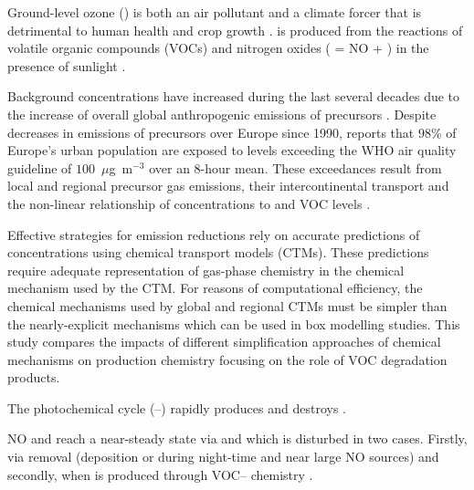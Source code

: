 Ground-level ozone () is both an air pollutant and a climate forcer that is detrimental to human health and crop growth \citep{Stevenson:2013}. 
 is produced from the reactions of volatile organic compounds (VOCs) and nitrogen oxides ( = NO + ) in the presence of sunlight \citep{Atkinson:2000}.

Background  concentrations have increased during the last several decades due to the increase of overall global anthropogenic emissions of  precursors \citep{HTAP:2010}.
Despite decreases in emissions of  precursors over Europe since 1990, \citet{AQEU:2014} reports that $98$\% of Europe's urban population are exposed to levels exceeding the WHO air quality guideline of \mbox{$100$ $\mu$g m$^{-3}$} over an \mbox{$8$-hour} mean.
These exceedances result from local and regional  precursor gas emissions, their intercontinental transport and the non-linear relationship of  concentrations to  and VOC levels \citep{AQEU:2014}.

Effective strategies for emission reductions rely on accurate predictions of  concentrations using chemical transport models (CTMs). 
These predictions require adequate representation of gas-phase chemistry in the chemical mechanism used by the CTM. 
For reasons of computational efficiency, the chemical mechanisms used by global and regional CTMs must be simpler than the nearly-explicit mechanisms which can be used in box modelling studies.
This study compares the impacts of different simplification approaches of chemical mechanisms on  production chemistry focusing on the role of VOC degradation products.

The photochemical cycle (--) rapidly produces and destroys .
\begin{reactionlist}
\end{reactionlist}
NO and  reach a near-steady state via  and  which is disturbed in two cases. 
Firstly, via  removal (deposition or  during night-time and near large NO sources) and secondly, when  is produced through VOC-- chemistry \citep{Sillman:1999}.

